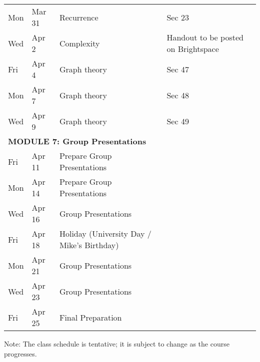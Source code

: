 \documentclass[letterpaper]{inzane_syllabus} %
\begin{document}
\begin{center}
\begin{tabularx}{\textwidth}{p{2cm}p{2cm}p{8cm}p{9.5cm}}
\hline
Mon &  Mar 31 & Recurrence  & Sec 23 \\
Wed &  Apr 2 & Complexity & Handout to be posted on Brightspace \\
Fri &  Apr 4 & Graph theory & Sec 47 \\
Mon &  Apr 7 & Graph theory & Sec 48 \\
Wed &  Apr 9 & Graph theory & Sec 49 \\
\hline
\multicolumn{4}{l}{\textbf{\textcolor{myCOLOR}{\large MODULE 7: Group Presentations}}} \\
\hline
Fri &  Apr 11 & Prepare Group Presentations & \\
Mon &  Apr 14 & Prepare Group Presentations & \\
Wed &  Apr 16 & Group Presentations & \\
Fri &  Apr 18 & Holiday (University Day / Mike's Birthday) & \\
Mon &  Apr 21 & Group Presentations  & \\
Wed &  Apr 23 & Group Presentations & \\
Fri &  Apr 25 & Final Preparation &\\
%
\hline 
\end{tabularx}
Note: The class schedule is tentative; it is subject to change as the course progresses.
\end{center}
\end{document}
